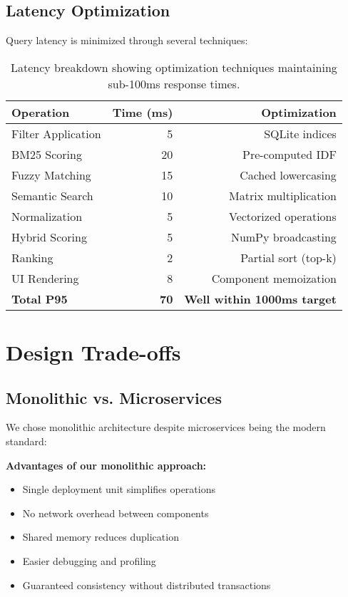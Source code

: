 \subsection{Latency Optimization}

Query latency is minimized through several techniques:

\begin{table}[ht]
\centering
\begin{tabular}{lrr}
\toprule
\textbf{Operation} & \textbf{Time (ms)} & \textbf{Optimization} \\
\midrule
Filter Application & 5 & SQLite indices \\
BM25 Scoring & 20 & Pre-computed IDF \\
Fuzzy Matching & 15 & Cached lowercasing \\
Semantic Search & 10 & Matrix multiplication \\
Normalization & 5 & Vectorized operations \\
Hybrid Scoring & 5 & NumPy broadcasting \\
Ranking & 2 & Partial sort (top-k) \\
UI Rendering & 8 & Component memoization \\
\midrule
\textbf{Total P95} & \textbf{70} & \textbf{Well within 1000ms target} \\
\bottomrule
\end{tabular}
\caption{Latency breakdown showing optimization techniques maintaining sub-100ms response times.}
\label{tab:latency-breakdown}
\end{table}

\section{Design Trade-offs}

\subsection{Monolithic vs. Microservices}

We chose monolithic architecture despite microservices being the modern standard:

\textbf{Advantages of our monolithic approach:}
\begin{itemize}[leftmargin=*,itemsep=2pt,topsep=2pt]
  \item Single deployment unit simplifies operations
  \item No network overhead between components  
  \item Shared memory reduces duplication
  \item Easier debugging and profiling
  \item Guaranteed consistency without distributed transactions
\end{itemize}

